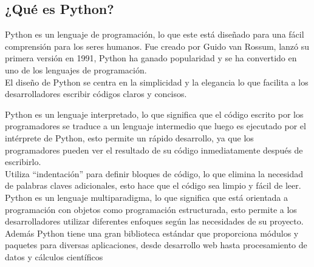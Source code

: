 \subsection{¿Qué es Python?}
Python es un lenguaje de programación, lo que este está diseñado para una fácil comprensión para los seres humanos. Fue creado por Guido van Rossum, lanzó su primera versión en 1991, Python ha ganado popularidad y se ha convertido en uno de los lenguajes de programación.\\

El diseño de Python se centra en la simplicidad y la elegancia lo que facilita a los desarrolladores escribir códigos claros y concisos.

Python es un lenguaje interpretado, lo que significa que el código escrito por los programadores se traduce a un lenguaje intermedio que luego es ejecutado por el intérprete de Python, esto permite un rápido desarrollo, ya que los programadores pueden ver el resultado de su código inmediatamente después de escribirlo.\\

Utiliza ``indentación'' para definir bloques de código, lo que elimina la necesidad de palabras claves adicionales, esto hace que el código sea limpio y fácil de leer.
Python es un lenguaje multiparadigma, lo que significa que está orientada a programación con objetos como programación estructurada, esto permite a los desarrolladores utilizar diferentes enfoques según las necesidades de su proyecto. Además Python tiene una gran biblioteca estándar que proporciona módulos y paquetes para diversas aplicaciones, desde desarrollo web hasta procesamiento de datos
y cálculos científicos 

